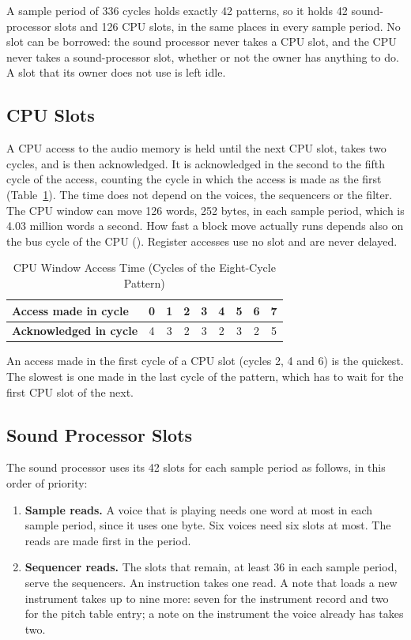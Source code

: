 A sample period of 336 cycles holds exactly 42 patterns, so it holds 42 sound-processor slots and 126 CPU slots, in the
same places in every sample period. No slot can be borrowed: the sound processor never takes a CPU slot, and the CPU
never takes a sound-processor slot, whether or not the owner has anything to do. A slot that its owner does not use is
left idle.

\subsection{CPU Slots}
\label{sec:cpu-slots}

A CPU access to the audio memory is held until the next CPU slot, takes two cycles, and is then acknowledged. It is
acknowledged in the second to the fifth cycle of the access, counting the cycle in which the access is made as the
first (Table~\ref{tab:cpu-latency}). The time does not depend on the voices, the sequencers or the filter. The CPU
window can move 126 words, 252 bytes, in each sample period, which is 4.03 million words a second. How fast a block
move actually runs depends also on the bus cycle of the CPU (\hwmanual{}). Register accesses use no slot and are never
delayed.

\begin{table}[H]
	\centering
	\begin{tabular}{p{5.2cm}cccccccc}
		\toprule
		\textbf{Access made in cycle}  & 0 & 1 & 2 & 3 & 4 & 5 & 6 & 7 \\
		\midrule
		\textbf{Acknowledged in cycle} & 4 & 3 & 2 & 3 & 2 & 3 & 2 & 5 \\
		\bottomrule
	\end{tabular}
	\caption{CPU Window Access Time (Cycles of the Eight-Cycle Pattern)}
	\label{tab:cpu-latency}
\end{table}

An access made in the first cycle of a CPU slot (cycles 2, 4 and 6) is the quickest. The slowest is one made in the
last cycle of the pattern, which has to wait for the first CPU slot of the next.

\subsection{Sound Processor Slots}
\label{sec:spu-slots}

The sound processor uses its 42 slots for each sample period as follows, in this order of priority:

\begin{enumerate}
	\item \textbf{Sample reads.} A voice that is playing needs one word at most in each sample period, since it uses one
	      byte. Six voices need six slots at most. The reads are made first in the period.
	\item \textbf{Sequencer reads.} The slots that remain, at least 36 in each sample period, serve the sequencers. An
	      instruction takes one read. A note that loads a new instrument takes up to nine more: seven for the instrument
	      record and two for the pitch table entry; a note on the instrument the voice already has takes two.
\end{enumerate}

